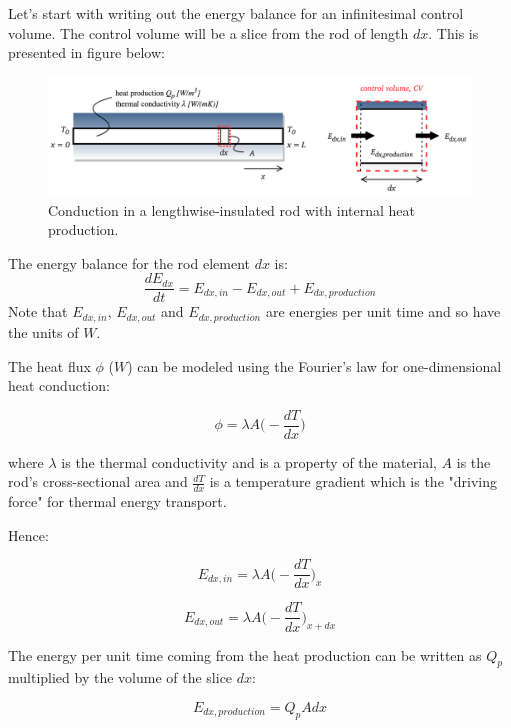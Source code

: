 \documentclass[20pt]{report}
\begin{document}
Let's start with writing out the energy balance for an infinitesimal control volume. The control volume will be a slice from the rod of length $dx$. This is presented in figure below:
\begin{figure}[H]
\centering\includegraphics[width=16cm]{plots/cond-rod.png}
\caption{Conduction in a lengthwise-insulated rod with internal heat production.}
\label{fig:conduction}
\end{figure}
The energy balance for the rod element $dx$ is:
\begin{equation}
\frac{dE_{dx}}{dt} = E_{dx, in} - E_{dx, out} + E_{dx, production}
\end{equation}
Note that $E_{dx, in}$, $E_{dx, out}$ and $E_{dx, production}$ are energies per unit time and so have the units of $W$.

The heat flux $\phi$ ($W$) can be modeled using the Fourier's law for one-dimensional heat conduction:

\begin{equation}
\phi = \lambda A \Big(- \frac{dT}{dx} \Big)
\label{eq:fourier}
\end{equation}

where $\lambda$ is the thermal conductivity and is a property of the material, $A$ is the rod's cross-sectional area and $\frac{dT}{dx}$ is a temperature gradient which is the "driving force" for thermal energy transport.

Hence:

\begin{equation}
E_{dx, in} = \lambda A \Big(- \frac{dT}{dx} \Big)_x
\end{equation}

\begin{equation}
E_{dx, out} = \lambda A \Big(- \frac{dT}{dx} \Big)_{x + dx}
\end{equation}

The energy per unit time coming from the heat production can be written as $Q_p$ multiplied by the volume of the slice $dx$:

\begin{equation}
E_{dx, production} = Q_p A dx
\end{equation}
\end{document}
